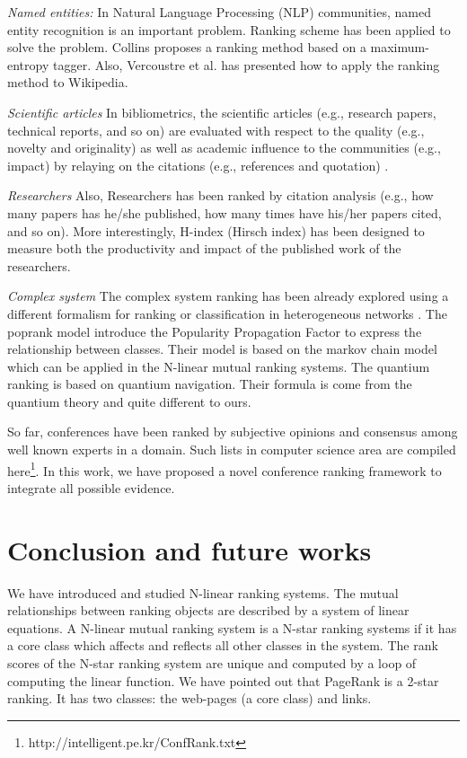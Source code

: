 \documentclass[10pt,leqno,twoside]{article}
\begin{document}
\textit{Named entities:}
In Natural Language Processing (NLP) communities, named entity recognition is an important problem.
Ranking scheme has been applied to solve the problem. Collins \cite{Collins-ACL-02} proposes a ranking method based on a maximum-entropy tagger. Also,
Vercoustre et al. \cite{Vercoustre-SAC-08} has presented how to apply the ranking method to Wikipedia.

\textit{Scientific articles}
In bibliometrics, the scientific articles (e.g., research papers, technical reports, and so on) are evaluated with respect to the quality (e.g., novelty and originality) as well as academic influence to the communities (e.g., impact) by relaying on the citations (e.g., references and quotation) \cite{Cronin-JIS-01}.

\textit{Researchers}
Also, Researchers has been ranked by citation analysis (e.g., how many papers has he/she published, how many times have his/her papers cited, and so on). More interestingly, H-index (Hirsch index) has been designed to
measure both the productivity and impact of the published work of the researchers.

\textit{Complex system}
The complex system ranking has been already explored using a different formalism for ranking or classification in heterogeneous networks \cite{poprank,complexrank}.
The poprank model \cite{poprank} introduce the Popularity Propagation Factor to express the relationship between classes. Their model is based on the markov chain model which can be applied in the N-linear mutual ranking systems. The quantium ranking \cite{complexrank} is based on quantium navigation. Their formula is come from the quantium theory and quite different to ours.

So far, conferences have been ranked by subjective opinions and consensus among well known experts in a domain.
Such lists in computer science area are compiled here\footnote{http://intelligent.pe.kr/ConfRank.txt}.
In this work, we have proposed a novel conference ranking framework to integrate all possible evidence.



\section{Conclusion and future works}\label{Sect:Conclusion}
We have introduced and studied N-linear ranking systems. The mutual relationships between ranking objects are described by a system of linear equations. A N-linear mutual ranking system is a N-star ranking systems if it has a core class which affects and reflects all other classes in the system. The rank scores of the N-star ranking system are unique and computed by a loop of computing the linear function. We have pointed out that PageRank is a 2-star ranking. It has two classes:  the web-pages (a core class) and links.
\end{document}
